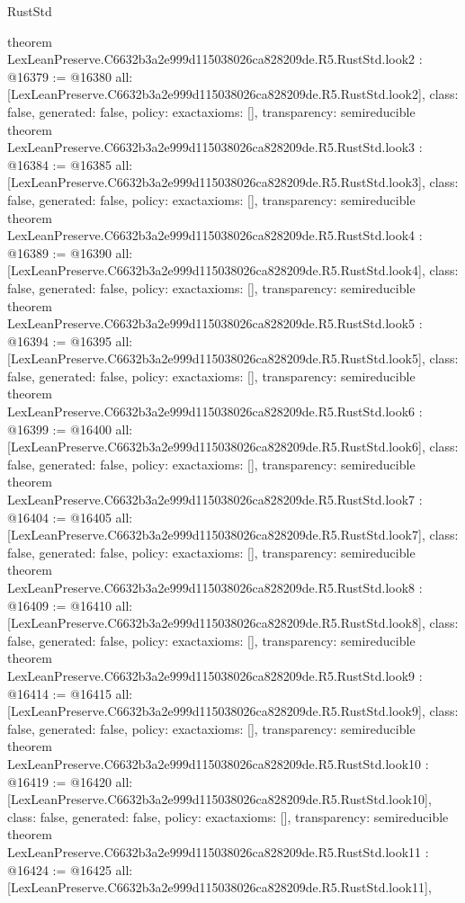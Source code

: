 \begin{lexlean}{RustStd}
\begin{coremodule}
{}
theorem LexLeanPreserve.C6632b3a2e999d115038026ca828209de.R5.RustStd.look2 : @16379 := @16380 {
  all: [LexLeanPreserve.C6632b3a2e999d115038026ca828209de.R5.RustStd.look2],
  class: false,
  generated: false,
  policy: exact{axioms: []},
  transparency: semireducible
}
theorem LexLeanPreserve.C6632b3a2e999d115038026ca828209de.R5.RustStd.look3 : @16384 := @16385 {
  all: [LexLeanPreserve.C6632b3a2e999d115038026ca828209de.R5.RustStd.look3],
  class: false,
  generated: false,
  policy: exact{axioms: []},
  transparency: semireducible
}
theorem LexLeanPreserve.C6632b3a2e999d115038026ca828209de.R5.RustStd.look4 : @16389 := @16390 {
  all: [LexLeanPreserve.C6632b3a2e999d115038026ca828209de.R5.RustStd.look4],
  class: false,
  generated: false,
  policy: exact{axioms: []},
  transparency: semireducible
}
theorem LexLeanPreserve.C6632b3a2e999d115038026ca828209de.R5.RustStd.look5 : @16394 := @16395 {
  all: [LexLeanPreserve.C6632b3a2e999d115038026ca828209de.R5.RustStd.look5],
  class: false,
  generated: false,
  policy: exact{axioms: []},
  transparency: semireducible
}
theorem LexLeanPreserve.C6632b3a2e999d115038026ca828209de.R5.RustStd.look6 : @16399 := @16400 {
  all: [LexLeanPreserve.C6632b3a2e999d115038026ca828209de.R5.RustStd.look6],
  class: false,
  generated: false,
  policy: exact{axioms: []},
  transparency: semireducible
}
theorem LexLeanPreserve.C6632b3a2e999d115038026ca828209de.R5.RustStd.look7 : @16404 := @16405 {
  all: [LexLeanPreserve.C6632b3a2e999d115038026ca828209de.R5.RustStd.look7],
  class: false,
  generated: false,
  policy: exact{axioms: []},
  transparency: semireducible
}
theorem LexLeanPreserve.C6632b3a2e999d115038026ca828209de.R5.RustStd.look8 : @16409 := @16410 {
  all: [LexLeanPreserve.C6632b3a2e999d115038026ca828209de.R5.RustStd.look8],
  class: false,
  generated: false,
  policy: exact{axioms: []},
  transparency: semireducible
}
theorem LexLeanPreserve.C6632b3a2e999d115038026ca828209de.R5.RustStd.look9 : @16414 := @16415 {
  all: [LexLeanPreserve.C6632b3a2e999d115038026ca828209de.R5.RustStd.look9],
  class: false,
  generated: false,
  policy: exact{axioms: []},
  transparency: semireducible
}
theorem LexLeanPreserve.C6632b3a2e999d115038026ca828209de.R5.RustStd.look10 : @16419 := @16420 {
  all: [LexLeanPreserve.C6632b3a2e999d115038026ca828209de.R5.RustStd.look10],
  class: false,
  generated: false,
  policy: exact{axioms: []},
  transparency: semireducible
}
theorem LexLeanPreserve.C6632b3a2e999d115038026ca828209de.R5.RustStd.look11 : @16424 := @16425 {
  all: [LexLeanPreserve.C6632b3a2e999d115038026ca828209de.R5.RustStd.look11],
}
\end{coremodule}
\end{lexlean}
